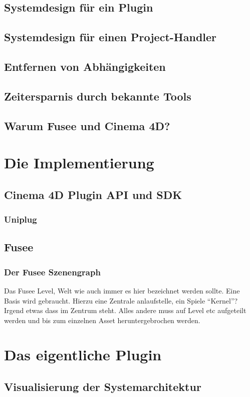 \documentclass[pagesize, paper=a4, fontsize=12pt,titlepage=true, headings=small, headnosepline, abstractoff, liststotoc, nochapterprefix, plainheadsepline, twoside]{scrreprt}
\begin{document}
\subsection{Systemdesign für ein Plugin}
\subsection{Systemdesign für einen Project-Handler}
\subsection{Entfernen von Abhängigkeiten}
\subsection{Zeitersparnis durch bekannte Tools}
\subsection{Warum Fusee und Cinema 4D?}

\section{Die Implementierung}
\subsection{Cinema 4D Plugin API und SDK}
\subsubsection{Uniplug}
\subsection{Fusee}
\subsubsection{Der Fusee Szenengraph}
Das Fusee Level, Welt wie auch immer es hier bezeichnet werden sollte. Eine Basis wird gebraucht. Hierzu eine Zentrale anlaufstelle, ein Spiele “Kernel”? Irgend etwas dass im Zentrum steht.
Alles andere muss auf Level etc aufgeteilt werden und bis zum einzelnen Asset heruntergebrochen werden.

\section{Das eigentliche Plugin}
\subsection{Visualisierung der Systemarchitektur}
\end{document}
